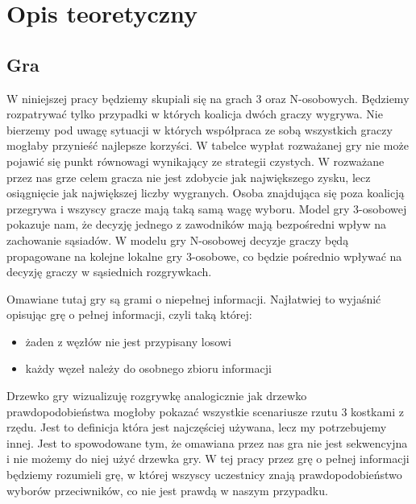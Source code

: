 \chapter{Opis teoretyczny}
\label{cha:opis_teor}

\section{Gra}
\label{sec:gra}
W niniejszej pracy będziemy skupiali się na grach 3 oraz N-osobowych. Będziemy rozpatrywać tylko przypadki w których koalicja dwóch graczy wygrywa. Nie bierzemy pod uwagę sytuacji w których współpraca ze sobą wszystkich graczy mogłaby przynieść najlepsze korzyści. W tabelce wypłat rozważanej gry nie może pojawić się punkt równowagi wynikający ze strategii czystych. W rozważane przez nas grze celem gracza nie jest zdobycie jak największego zysku, lecz osiągnięcie jak największej liczby wygranych. Osoba znajdująca się poza koalicją przegrywa i wszyscy gracze mają taką samą wagę wyboru. Model gry 3-osobowej pokazuje nam, że decyzję jednego z zawodników mają bezpośredni wpływ na zachowanie sąsiadów. W modelu gry N-osobowej decyzje graczy będą propagowane na kolejne lokalne gry 3-osobowe, co będzie pośrednio wpływać na decyzję graczy w sąsiednich rozgrywkach.

Omawiane tutaj gry są grami o niepełnej informacji. Najłatwiej to wyjaśnić opisując grę o pełnej informacji, czyli taką której:
\begin{itemize}
\item żaden z węzłów nie jest przypisany losowi
\item każdy węzeł należy do osobnego zbioru informacji
\end{itemize}
Drzewko gry wizualizuję rozgrywkę analogicznie jak drzewko prawdopodobieństwa mogłoby pokazać wszystkie scenariusze rzutu 3 kostkami z rzędu. Jest to definicja która jest najczęściej używana, lecz my potrzebujemy innej. Jest to spowodowane tym, że omawiana przez nas gra nie jest sekwencyjna i nie możemy do niej użyć drzewka gry. W tej pracy przez grę o pełnej informacji będziemy rozumieli grę, w której wszyscy uczestnicy znają prawdopodobieństwo wyborów przeciwników, co nie jest prawdą w naszym przypadku.

